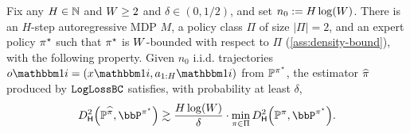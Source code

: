 \begin{proposition}\label{prop:log-loss-prob-lb-app}
  Fix any $H \in \mathbb{N}$ and $W \geq 2$ and $\delta \in (0,1/2)$, and set $n_0 := H\log(W)$. There is an $H$-step autoregressive MDP $M$, a policy class $\Pi$ of size $|\Pi| = 2$, and an expert policy $\pi^{\star}$ such that $\pi^{\star}$ is $W$-bounded with respect to $\Pi$ (\cref{ass:density-bound}), with the following property. Given $n_0$ i.i.d. trajectories $o\ind{i} = (x\ind{i},a_{1:H}\ind{i})$ from $\mathbb{P}^{\pi^{\star}}$, the estimator $\widehat{\pi}$ produced by $\texttt{LogLossBC}$ satisfies, with probability at least $\delta$,
  \[\Dhels{\BP^{\pihat}}{\bbP^{\pistar}} \gtrsim \frac{H\log(\denbound)}{\delta} \cdot \min_{\pi\in\Pi} \Dhels{\BP^\pi}{\bbP^{\pistar}}.\]
  \end{proposition}

